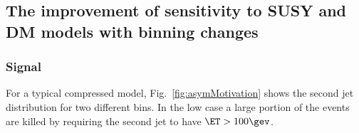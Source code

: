 \begin{table}[h]
\begin{tabular}
\hline\hline
  \end{tabular}
\end{table}



\subsection{The improvement of sensitivity to SUSY and DM models with binning changes}

\subsubsection{Signal }\label{sec:asym_bin}

For a typical compressed model, Fig.~\ref{fig:asymMotivation} shows the second jet \PT
distribution for two different \HT bins. In the low \HT case a large portion of
the events are killed by requiring the second jet to have $\ET>100\gev$. 

